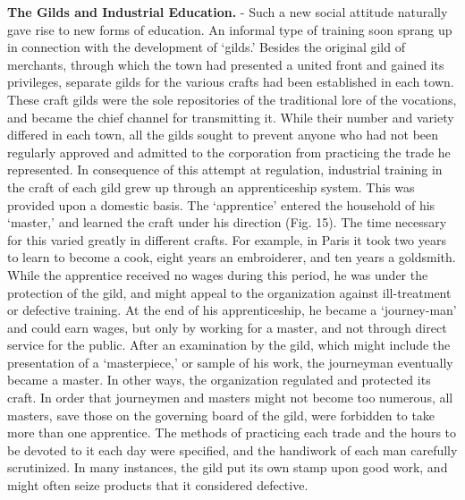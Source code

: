 \documentclass[]{book}
\begin{document}
\textbf{The Gilds and Industrial Education.} - Such a new social attitude naturally gave rise to new forms of education. An informal type of training soon sprang up in connection with the development of `gilds.' Besides the original gild of merchants, through which the town had presented a united front and gained its privileges, separate gilds for the various crafts had been established in each town. These craft gilds were the sole repositories of the traditional lore of the vocations, and became the chief channel for transmitting it. While their number and variety differed in each town, all the gilds sought to prevent anyone who had not been regularly approved and admitted to the corporation from practicing the trade he represented. In consequence of this attempt at regulation, industrial training in the craft of each gild grew up through an apprenticeship system. This was provided upon a domestic basis. The `apprentice' entered the household of his `master,' and learned the craft under his direction (Fig. 15). The time necessary for this varied greatly in different crafts. For example, in Paris it took two years to learn to become a cook, eight years an embroiderer, and ten years a goldsmith. While the apprentice received no wages during this period, he was under the protection of the gild, and might appeal to the organization against ill-treatment or defective training. At the end of his apprenticeship, he became a `journey-man' and could earn wages, but only by working for a master, and not through direct service for the public. After an examination by the gild, which might include the presentation of a `masterpiece,' or sample of his work, the journeyman eventually became a master. In other ways, the organization regulated and protected its craft. In order that journeymen and masters might not become too numerous, all masters, save those on the governing board of the gild, were forbidden to take more than one apprentice. The methods of practicing each trade and the hours to be devoted to it each day were specified, and the handiwork of each man carefully scrutinized. In many instances, the gild put its own stamp upon good work, and might often seize products that it considered defective.
\end{document}
